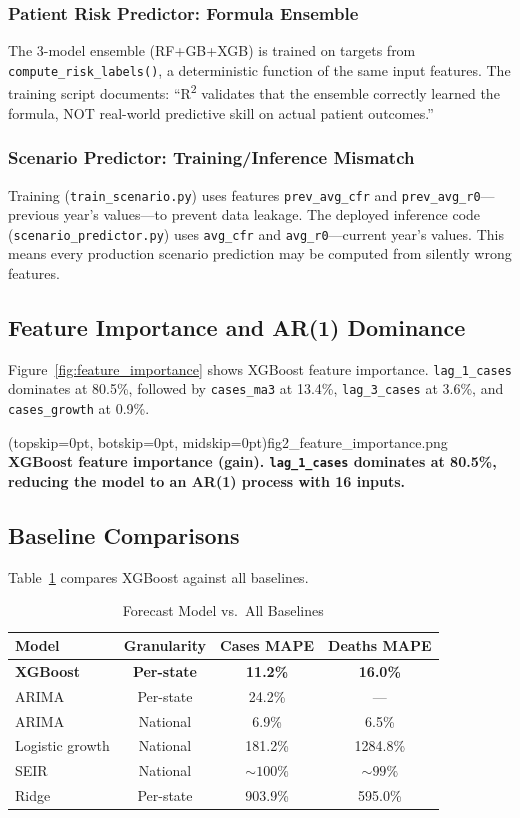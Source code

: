 \documentclass{ieeeaccess}
\begin{document}
\subsubsection{Patient Risk Predictor: Formula Ensemble}
The 3-model ensemble (RF+GB+XGB) is trained on targets from \texttt{compute\_risk\_labels()}, a deterministic function of the same input features. The training script documents: ``R\textsuperscript{2} validates that the ensemble correctly learned the formula, NOT real-world predictive skill on actual patient outcomes.''

\subsubsection{Scenario Predictor: Training/Inference Mismatch}
Training (\texttt{train\_scenario.py}) uses features \texttt{prev\_avg\_cfr} and \texttt{prev\_avg\_r0}---previous year's values---to prevent data leakage. The deployed inference code (\texttt{scenario\_predictor.py}) uses \texttt{avg\_cfr} and \texttt{avg\_r0}---current year's values. This means every production scenario prediction may be computed from silently wrong features.

\subsection{Feature Importance and AR(1) Dominance}
Figure~\ref{fig:feature_importance} shows XGBoost feature importance. \texttt{lag\_1\_cases} dominates at 80.5\%, followed by \texttt{cases\_ma3} at 13.4\%, \texttt{lag\_3\_cases} at 3.6\%, and \texttt{cases\_growth} at 0.9\%.

\Figure[t!](topskip=0pt, botskip=0pt, midskip=0pt){fig2_feature_importance.png}
{\textbf{XGBoost feature importance (gain). \texttt{lag\_1\_cases} dominates at 80.5\%, reducing the model to an AR(1) process with 16 inputs.}\label{fig:feature_importance}}

\subsection{Baseline Comparisons}
Table~\ref{tab:results} compares XGBoost against all baselines.

\begin{table}[h]
\centering
\caption{Forecast Model vs.\ All Baselines}
\label{tab:results}
\small
\begin{tabular}{lccc}
\toprule
Model & Granularity & Cases MAPE & Deaths MAPE \\
\midrule
\textbf{XGBoost} & \textbf{Per-state} & \textbf{11.2\%} & \textbf{16.0\%} \\
\midrule
ARIMA & Per-state & 24.2\% & --- \\
ARIMA & National & 6.9\% & 6.5\% \\
Logistic growth & National & 181.2\% & 1284.8\% \\
SEIR & National & $\sim100\%$ & $\sim99\%$ \\
Ridge & Per-state & 903.9\% & 595.0\% \\
\bottomrule
\end{tabular}
\end{table}
\end{document}
